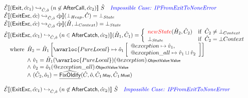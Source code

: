 \[\begin{array}{l}
\aE \lbr (\SF{Exit}, \hat{cc}_1) \cfgnext_{\hat{C},\hat{o}} (n \not\in \SF{AfterCall}, \hat{cc}_2) \rbr\ \hat{S}
    \quad \comment{\inblue Impossible Case: IPFromExitToNoneError} \\

\aE \lbr (\SF{ExitExc}, \hat{cc}) \cfgnext_{\hat{C},\hat{o}} \acp \rbr (\bot_{Heap}, \hat{C})
    = \bot_{State}\\

\aE \lbr (\SF{ExitExc}, \hat{cc}) \cfgnext_{\hat{C},\hat{o}} \acp \rbr (\hat{H}, \bot_{Context})
    = \bot_{State}\\

\aE \lbr (\SF{ExitExc}, \hat{cc}_1) \cfgnext_{\hat{C},\hat{o}} (n \in \SF{AfterCatch}, \hat{cc}_2) \rbr (\hat{H}_1, \hat{C}_1)
   = \left\{
   \begin{array}{ll}
   {\inred new State}(\hat{H}_2, \hat{C}_2) & \ifc{\hat{C}_2 \neq \bot_{Context}}\\
   \bot_{State} & \ifc{\hat{C}_2 = \bot{Context}}\\
   \end{array}
   \right. \\
\quad\wherec{
    \hat{H}_2 = \hat{H}_1 \left[ \avarloc{PureLocal} \mapsto 
        \hat{o}_1 \left[ \begin{array}{ll}
		    \varprop{exception} \mapsto \hat{v}_1, \\
			\varprop{exception\_all} \mapsto \hat{v}_1 \sqcup \hat{v}_2
		\end{array} \right] \right] \\
	\land\ \hat{v}_1 = \hat{H}_1(\avarloc{PureLocal})(\varprop{exception})\tsf{:ObjectValue:Value}\\
	\land\ \hat{v}_2 = \hat{o}_1(\varprop{exception\_all})\tsf{:ObjectValue:Value}\\
	\land\ (\hat{C}_2, \hat{o}_1) = \ahf{FixOldify}(\hat{C}, \hat{o}, \hat{C}_1\tsf{:May}, \hat{C}_1\tsf{:Must})
}\\\\

\aE \lbr (\SF{ExitExc}, \hat{cc}_1) \cfgnext_{\hat{C},\hat{o}} (n \not\in \SF{AfterCatch}, \hat{cc}_2) \rbr\ \hat{S}
    \quad \comment{\inblue Impossible Case: IPFromExitToNoneError} \\

\end{array}
\]

